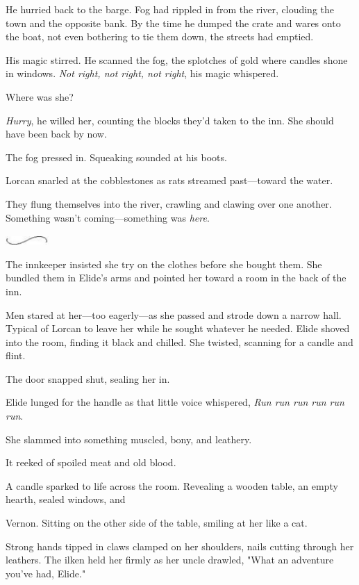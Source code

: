 He hurried back to the barge. Fog had rippled in from the river, clouding the town and the opposite bank. By the time he dumped the crate and wares onto the boat, not even bothering to tie them down, the streets had emptied.

His magic stirred. He scanned the fog, the splotches of gold where candles shone in windows. \emph{Not right, not right, not right}, his magic whispered.

Where was she?

\emph{Hurry}, he willed her, counting the blocks they'd taken to the inn. She should have been back by now.

The fog pressed in. Squeaking sounded at his boots.

Lorcan snarled at the cobblestones as rats streamed past---toward the water.

They flung themselves into the river, crawling and clawing over one another. Something wasn't coming---something was \emph{here}.

\includegraphics[width=0.65in,height=0.13in]{images/seperator}

The innkeeper insisted she try on the clothes before she bought them. She bundled them in Elide's arms and pointed her toward a room in the back of the inn.

Men stared at her---too eagerly---as she passed and strode down a narrow hall. Typical of Lorcan to leave her while he sought whatever he needed. Elide shoved into the room, finding it black and chilled. She twisted, scanning for a candle and flint.

The door snapped shut, sealing her in.

Elide lunged for the handle as that little voice whispered, \emph{Run run run run run run}.

She slammed into something muscled, bony, and leathery.

It reeked of spoiled meat and old blood.

A candle sparked to life across the room. Revealing a wooden table, an empty hearth, sealed windows, and 

Vernon. Sitting on the other side of the table, smiling at her like a cat.

Strong hands tipped in claws clamped on her shoulders, nails cutting through her leathers. The ilken held her firmly as her uncle drawled, "What an adventure you've had, Elide."
